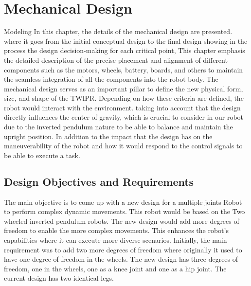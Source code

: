 \chapter{Mechanical Design}

\graphicspath{{./Figures/Mechanical Design/}}
 Modeling In this chapter, the details of the mechanical design are presented.
 where it goes from the initial conceptual design to the final design showing in the process the design decision-making for each critical point, This chapter emphasis the detailed description of the precise placement and alignment of different components such as the motors, wheels, battery, boards, and others to maintain the seamless integration of all the components into the robot body.
\newline
The mechanical design serves as an important pillar to define the new physical form, size, and shape of the TWIPR. Depending on how these criteria are defined, the robot would interact with the environment.
taking into account that the design directly influences the center of gravity, which is crucial to consider in our robot due to the inverted pendulum nature to be able to balance and maintain the upright position.
In addition to the impact that the design has on the maneuverability of the robot and how it would respond to the control signals to be able to execute a task.
\newpage
\section{Design Objectives and Requirements}

	The main objective is to come up with a new design for a multiple joints Robot to perform complex dynamic movements.
	This robot would be based on the Two wheeled inverted pendulum robots.
	The new design would add more degrees of freedom to enable the more complex movements.
	This enhances the robot's capabilities where it can execute more diverse scenarios.
	Initially, the main requirement was to add two more degrees of freedom where originally it used to have one degree of freedom in the wheels.
	The new design has three degrees of freedom, one in the wheels, one as a knee joint and one as a hip joint.
	The current design has two identical legs.

